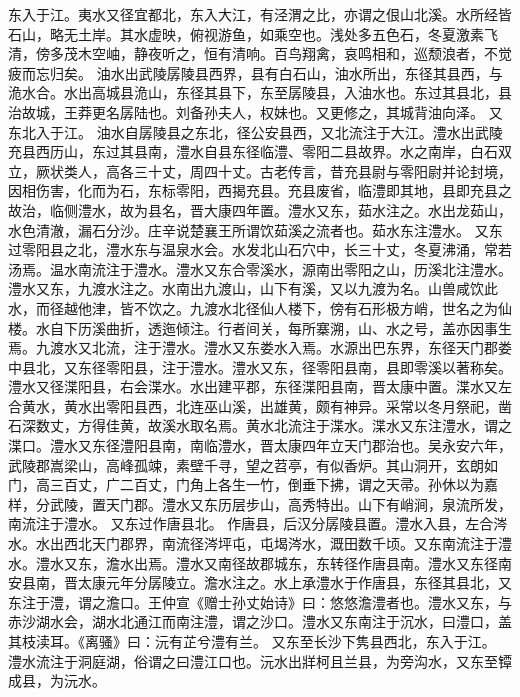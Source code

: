 \documentclass[12pt,UTF8]{ctexbook}
\begin{document}
东入于江。夷水又径宜都北，东入大江，有泾渭之比，亦谓之佷山北溪。水所经皆石山，略无土岸。其水虚映，俯视游鱼，如乘空也。浅处多五色石，冬夏激素飞清，傍多茂木空岫，静夜听之，恒有清响。百鸟翔禽，哀鸣相和，巡颓浪者，不觉疲而忘归矣。
油水出武陵孱陵县西界，县有白石山，油水所出，东径其县西，与洈水合。水出高城县洈山，东径其县下，东至孱陵县，入油水也。东过其县北，县治故城，王莽更名孱陆也。刘备孙夫人，权妹也。又更修之，其城背油向泽。
又东北入于江。
油水自孱陵县之东北，径公安县西，又北流注于大江。澧水出武陵充县西历山，东过其县南，澧水自县东径临澧、零阳二县故界。水之南岸，白石双立，厥状类人，高各三十丈，周四十丈。古老传言，昔充县尉与零阳尉并论封境，因相伤害，化而为石，东标零阳，西揭充县。充县废省，临澧即其地，县即充县之故治，临侧澧水，故为县名，晋大康四年置。澧水又东，茹水注之。水出龙茹山，水色清澈，漏石分沙。庄辛说楚襄王所谓饮茹溪之流者也。茹水东注澧水。
又东过零阳县之北，澧水东与温泉水会。水发北山石穴中，长三十丈，冬夏沸涌，常若汤焉。温水南流注于澧水。澧水又东合零溪水，源南出零阳之山，历溪北注澧水。澧水又东，九渡水注之。水南出九渡山，山下有溪，又以九渡为名。山兽咸饮此水，而径越他津，皆不饮之。九渡水北径仙人楼下，傍有石形极方峭，世名之为仙楼。水自下历溪曲折，透迤倾注。行者间关，每所寨溯，山、水之号，盖亦因事生焉。九渡水又北流，注于澧水。澧水又东娄水入焉。水源出巴东界，东径天门郡娄中县北，又东径零阳县，注于澧水。澧水又东，径零阳县南，县即零溪以著称矣。澧水又径渫阳县，右会渫水。水出建平郡，东径渫阳县南，晋太康中置。渫水又左合黄水，黄水出零阳县西，北连巫山溪，出雄黄，颇有神异。采常以冬月祭祀，凿石深数丈，方得佳黄，故溪水取名焉。黄水北流注于渫水。渫水又东注澧水，谓之渫口。澧水又东径澧阳县南，南临澧水，晋太康四年立天门郡治也。吴永安六年，武陵郡嵩梁山，高峰孤竦，素壁千寻，望之苕亭，有似香炉。其山洞开，玄朗如门，高三百丈，广二百丈，门角上各生一竹，倒垂下拂，谓之天帚。孙休以为嘉样，分武陵，置天门郡。澧水又东历层步山，高秀特出。山下有峭涧，泉流所发，南流注于澧水。
又东过作唐县北。
作唐县，后汉分孱陵县置。澧水入县，左合涔水。水出西北天门郡界，南流径涔坪屯，屯堨涔水，溉田数千顷。又东南流注于澧水。澧水又东，澹水出焉。澧水又南径故郡城东，东转径作唐县南。澧水又东径南安县南，晋太康元年分孱陵立。澹水注之。水上承澧水于作唐县，东径其县北，又东注于澧，谓之澹口。王仲宣《赠士孙丈始诗》曰：悠悠澹澧者也。澧水又东，与赤沙湖水会，湖水北通江而南注澧，谓之沙口。澧水又东南注于沉水，曰澧口，盖其枝渎耳。《离骚》曰：沅有芷兮澧有兰。
又东至长沙下隽县西北，东入于江。
澧水流注于洞庭湖，俗谓之曰澧江口也。沅水出牂柯且兰县，为旁沟水，又东至镡成县，为沅水。
\end{document}
